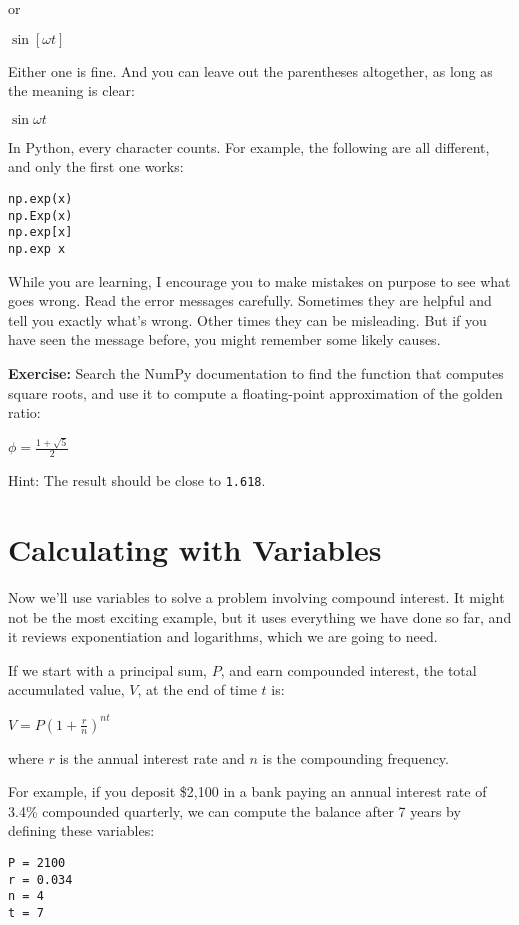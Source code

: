 or

\(\sin [\omega t]\)

Either one is fine. And you can leave out the parentheses altogether, as
long as the meaning is clear:

\(\sin \omega t\)

In Python, every character counts. For example, the following are all
different, and only the first one works:

\begin{lstlisting}
np.exp(x)
np.Exp(x)
np.exp[x]
np.exp x
\end{lstlisting}

While you are learning, I encourage you to make mistakes on purpose to
see what goes wrong. Read the error messages carefully. Sometimes they
are helpful and tell you exactly what's wrong. Other times they can be
misleading. But if you have seen the message before, you might remember
some likely causes.

\textbf{Exercise:} Search the NumPy documentation to find the function
that computes square roots, and use it to compute a floating-point
approximation of the golden ratio:

\(\phi = \frac{1 + \sqrt{5}}{2}\)

Hint: The result should be close to \passthrough{\lstinline!1.618!}.

\hypertarget{calculating-with-variables}{%
\section{Calculating with Variables}\label{calculating-with-variables}}

Now we'll use variables to solve a problem involving compound interest.
It might not be the most exciting example, but it uses everything we
have done so far, and it reviews exponentiation and logarithms, which we
are going to need.

If we start with a principal sum, \(P\), and earn compounded interest,
the total accumulated value, \(V\), at the end of time \(t\) is:

\(V=P\left(1+{\frac {r}{n}}\right)^{nt}\)

where \(r\) is the annual interest rate and \(n\) is the compounding
frequency.

For example, if you deposit \$2,100 in a bank paying an annual interest
rate of 3.4\% compounded quarterly, we can compute the balance after 7
years by defining these variables:

\begin{lstlisting}[]
P = 2100
r = 0.034
n = 4
t = 7
\end{lstlisting}

